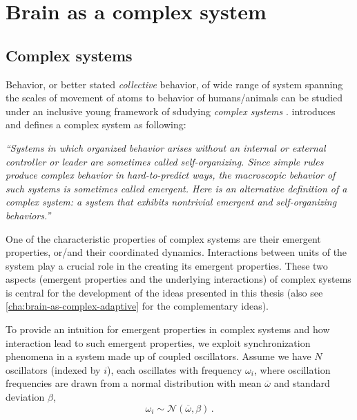 \chapter{Brain as a complex system}\label{cha:brain-as-complex}
\section{Complex systems}\label{sec:complex-systems}
Behavior, or better stated \emph{collective} behavior, of wide range of system spanning the scales of movement of atoms to behavior of humans/animals can be studied under an inclusive young framework of sdudying \emph{complex systems}
\cite{bar-yamDynamicsComplexSystems2003,mitchellComplexityGuidedTour2011,hollandComplexityVeryShort2014,bar-yamWhyComplexityDifferent2017}.
\citet[Chapter 1]{mitchellComplexityGuidedTour2011} introduces and defines a complex system as following:
\begin{displayquote}\textsl{
    ``Systems in which organized behavior arises without an internal or external controller
    or leader are sometimes called self-organizing.
    Since simple rules produce complex behavior in hard-to-predict ways,
    the macroscopic behavior of such systems is sometimes called emergent.
    Here is an alternative definition of a complex system:
    a system that exhibits nontrivial emergent and self-organizing behaviors.''
  }
\end{displayquote}

One of the characteristic properties of complex systems are their
emergent properties, or/and their coordinated dynamics.
Interactions between units of the system play a crucial role in the creating its emergent properties.
These two aspects (emergent properties and the underlying interactions) of complex systems is central for the development of the ideas presented in this thesis (also see \autoref{cha:brain-as-complex-adaptive} for the complementary ideas).


To provide an intuition for emergent properties in complex systems and how interaction lead to such emergent properties,
we exploit synchronization phenomena in a system made up of coupled oscillators.
Assume we have $N$ oscillators (indexed by $i$), each oscillates with frequency $\omega_i$,
where oscillation frequencies are drawn from a normal distribution with mean $\overline{\omega}$ and standard deviation $\beta$,
\[
\omega_i \sim \mathcal{N}\left(\overline{\omega}, \beta \right)\,.
\]


